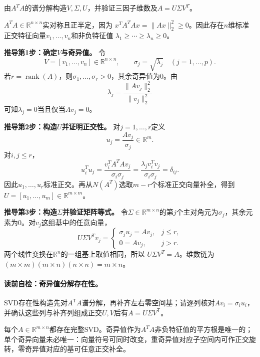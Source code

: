 \label{struct:V4-C03-CH11}
\begin{derivationgoalbox}
由$A^TA$的谱分解构造$V,\Sigma,U$，并验证三因子维数及$A=U\Sigma V^T$。
\end{derivationgoalbox}
\begin{derivationprepbox}
$A^TA\in\mathbb R^{n\times n}$实对称且正半定，因为
$x^TA^TAx=\|Ax\|_2^2\geq0$。因此存在$n$维标准正交特征向量$v_1,\ldots,v_n$和非负特征值
$\lambda_1\geq\cdots\geq\lambda_n\geq0$。
\end{derivationprepbox}

\textbf{推导第1步：确定$V$与奇异值。}
令
\[
V=[v_1,\ldots,v_n]\in\mathbb R^{n\times n},\qquad
\sigma_j=\sqrt{\lambda_j}\quad(j=1,\ldots,p).
\]
若$r=\operatorname{rank}(A)$，则$\sigma_1,\ldots,\sigma_r>0$，其余奇异值为0。由
\[
\lambda_j=\frac{\|Av_j\|_2^2}{\|v_j\|_2^2}
\]
可知$\lambda_j=0$当且仅当$Av_j=0$。

\textbf{推导第2步：构造$U$并证明正交性。}
对$j=1,\ldots,r$定义
\[
u_j=\frac{Av_j}{\sigma_j}\in\mathbb R^m.
\]
对$i,j\leq r$，
\[
u_i^Tu_j
=\frac{v_i^TA^TAv_j}{\sigma_i\sigma_j}
=\frac{\lambda_jv_i^Tv_j}{\sigma_i\sigma_j}
=\delta_{ij}.
\]
因此$u_1,\ldots,u_r$标准正交。再从$N(A^T)$选取$m-r$个标准正交向量补全，得到
$U=[u_1,\ldots,u_m]\in\mathbb R^{m\times m}$。

\textbf{推导第3步：构造$\Sigma$并验证矩阵等式。}
令$\Sigma\in\mathbb R^{m\times n}$的第$j$个主对角元为$\sigma_j$，其余元素为0。对$v_j$这组基中的任意向量，
\[
U\Sigma V^Tv_j=
\begin{cases}
\sigma_ju_j=Av_j,&j\leq r,\\
0=Av_j,&j>r.
\end{cases}
\]
两个线性变换在$\mathbb R^n$的一组基上取值相同，所以
$U\Sigma V^T=A$。维数链为
$(m\times m)(m\times n)(n\times n)=m\times n$。

\label{struct:V4-C03-CH12}
\paragraph{读前自检：奇异值分解存在性。}SVD存在性构造先对$A^{\mathsf T}A$谱分解，再补齐左右零空间基；请逐列核对$Av_i=\sigma_i u_i$，并确认这些列与补齐列组成正交$U,V$后有$A=U\Sigma V^{\mathsf T}$。\par

\begin{theorem}[奇异值分解存在性]\label{thm:V4-C03-svd-existence}
每个$A\in\mathbb R^{m\times n}$都存在完整SVD。奇异值作为$A^TA$非负特征值的平方根是唯一的；单个奇异向量未必唯一：向量符号可同时改变，重奇异值对应子空间内可作正交旋转，零奇异值对应的基可任意正交补全。
\end{theorem}

